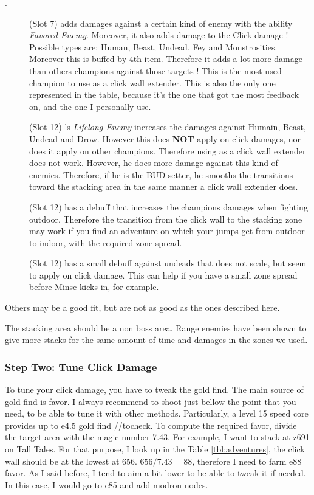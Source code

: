 \documentclass{article}
\begin{document}
\begin{description}
    \item[\minsc.] (Slot 7) \minsc adds damages against a certain kind of enemy with the ability \textit{Favored Enemy}.
    Moreover, it also adds damage to the Click damage !
    Possible types are: Human, Beast, Undead, Fey and Monstrosities.
    Moreover this is buffed by \minsc 4th item.
    Therefore it adds a lot more damage than others champions against those targets !
    This is the most used champion to use as a click wall extender.
    This is also the only one represented in the table, because it's the one that got the most feedback on, and the one I personally use.
    \item[\zorbu] (Slot 12) \zorbu's \textit{Lifelong Enemy} increases the damages against Humain, Beast, Undead and Drow.
    However this does \textbf{NOT} apply on click damages, nor does it apply on other champions.
    Therefore using \zorbu as a click wall extender does not work.
    However, he does more damage against this kind of enemies.
    Therefore, if he is the BUD setter, he smooths the transitions toward the stacking area in the same manner a click wall extender does.
    \item[\azaka] (Slot 12) \azaka has a debuff that increases the champions damages when fighting outdoor.
    Therefore the transition from the click wall to the stacking zone may work if you find an adventure on which your jumps get from outdoor to indoor, with the required zone spread.
    \item[\nerys] (Slot 12) \nerys has a small debuff against undeads that does not scale, but seem to apply on click damage.
    This can help if you have a small zone spread before Minsc kicks in, for example.
\end{description}

Others may be a good fit, but are not as good as the ones described here.

The stacking area should be a non boss area.
Range enemies have been shown to give more stacks for the same amount of time and damages in the zones we used.


\subsubsection{Step Two: Tune Click Damage}
\label{sec:stepTwo}

To tune your click damage, you have to tweak the gold find.
The main source of gold find is favor.
I always recommend to shoot just bellow the point that you need, to be able to tune it with other methods.
Particularly, a level 15 speed core provides up to e4.5 gold find //tocheck.
To compute the required favor, divide the target area with the magic number 7.43.
For example, I want to stack at z691 on Tall Tales.
For that purpose, I look up in the Table \ref{tbl:adventures}, the click wall should be at the lowest at 656.
$656 / 7.43 = 88$, therefore I need to farm e88 favor.
As I said before, I tend to aim a bit lower to be able to tweak it if needed.
In this case, I would go to e85 and add modron nodes.
\end{document}
